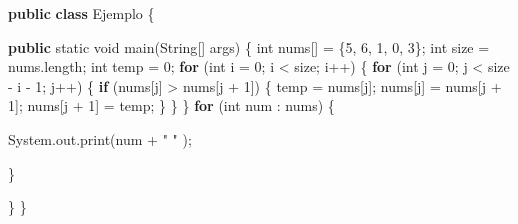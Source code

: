 \documentclass[
  spanish,
  letterpaper,
  DIV=11,
  numbers=noendperiod]{scrreprt}
\newenvironment{Shaded}{\begin{snugshade}}{\end{snugshade}}
\newcommand{\BuiltInTok}[1]{\textcolor[rgb]{0.00,0.23,0.31}{#1}}
\newcommand{\ControlFlowTok}[1]{\textcolor[rgb]{0.00,0.23,0.31}{\textbf{#1}}}
\newcommand{\DataTypeTok}[1]{\textcolor[rgb]{0.68,0.00,0.00}{#1}}
\newcommand{\DecValTok}[1]{\textcolor[rgb]{0.68,0.00,0.00}{#1}}
\newcommand{\FunctionTok}[1]{\textcolor[rgb]{0.28,0.35,0.67}{#1}}
\newcommand{\KeywordTok}[1]{\textcolor[rgb]{0.00,0.23,0.31}{\textbf{#1}}}
\newcommand{\NormalTok}[1]{\textcolor[rgb]{0.00,0.23,0.31}{#1}}
\newcommand{\OperatorTok}[1]{\textcolor[rgb]{0.37,0.37,0.37}{#1}}
\newcommand{\StringTok}[1]{\textcolor[rgb]{0.13,0.47,0.30}{#1}}
\begin{document}
\begin{Shaded}
\begin{Highlighting}[]
\KeywordTok{public} \KeywordTok{class}\NormalTok{ Ejemplo }\OperatorTok{\{}

    \KeywordTok{public} \DataTypeTok{static} \DataTypeTok{void} \FunctionTok{main}\OperatorTok{(}\BuiltInTok{String}\OperatorTok{[]}\NormalTok{ args}\OperatorTok{)} \OperatorTok{\{}
        \DataTypeTok{int}\NormalTok{ nums}\OperatorTok{[]} \OperatorTok{=} \OperatorTok{\{}\DecValTok{5}\OperatorTok{,} \DecValTok{6}\OperatorTok{,} \DecValTok{1}\OperatorTok{,} \DecValTok{0}\OperatorTok{,} \DecValTok{3}\OperatorTok{\};}
        \DataTypeTok{int}\NormalTok{ size }\OperatorTok{=}\NormalTok{ nums}\OperatorTok{.}\FunctionTok{length}\OperatorTok{;}
        \DataTypeTok{int}\NormalTok{ temp }\OperatorTok{=} \DecValTok{0}\OperatorTok{;}
        \ControlFlowTok{for} \OperatorTok{(}\DataTypeTok{int}\NormalTok{ i }\OperatorTok{=} \DecValTok{0}\OperatorTok{;}\NormalTok{ i }\OperatorTok{\textless{}}\NormalTok{ size}\OperatorTok{;}\NormalTok{ i}\OperatorTok{++)} \OperatorTok{\{}
            \ControlFlowTok{for} \OperatorTok{(}\DataTypeTok{int}\NormalTok{ j }\OperatorTok{=} \DecValTok{0}\OperatorTok{;}\NormalTok{ j }\OperatorTok{\textless{}}\NormalTok{ size }\OperatorTok{{-}}\NormalTok{ i }\OperatorTok{{-}} \DecValTok{1}\OperatorTok{;}\NormalTok{ j}\OperatorTok{++)} \OperatorTok{\{}
                \ControlFlowTok{if} \OperatorTok{(}\NormalTok{nums}\OperatorTok{[}\NormalTok{j}\OperatorTok{]} \OperatorTok{\textgreater{}}\NormalTok{ nums}\OperatorTok{[}\NormalTok{j }\OperatorTok{+} \DecValTok{1}\OperatorTok{])} \OperatorTok{\{}
\NormalTok{                    temp }\OperatorTok{=}\NormalTok{ nums}\OperatorTok{[}\NormalTok{j}\OperatorTok{];}
\NormalTok{                    nums}\OperatorTok{[}\NormalTok{j}\OperatorTok{]} \OperatorTok{=}\NormalTok{ nums}\OperatorTok{[}\NormalTok{j }\OperatorTok{+} \DecValTok{1}\OperatorTok{];}
\NormalTok{                    nums}\OperatorTok{[}\NormalTok{j }\OperatorTok{+} \DecValTok{1}\OperatorTok{]} \OperatorTok{=}\NormalTok{ temp}\OperatorTok{;}
                \OperatorTok{\}}
            \OperatorTok{\}}
        \OperatorTok{\}}
        \ControlFlowTok{for} \OperatorTok{(}\DataTypeTok{int}\NormalTok{ num }\OperatorTok{:}\NormalTok{ nums}\OperatorTok{)} \OperatorTok{\{}

            \BuiltInTok{System}\OperatorTok{.}\FunctionTok{out}\OperatorTok{.}\FunctionTok{print}\OperatorTok{(}\NormalTok{num }\OperatorTok{+} \StringTok{" "} \OperatorTok{);}

        \OperatorTok{\}}

    \OperatorTok{\}}
\OperatorTok{\}}
\end{Highlighting}
\end{Shaded}
\end{document}
